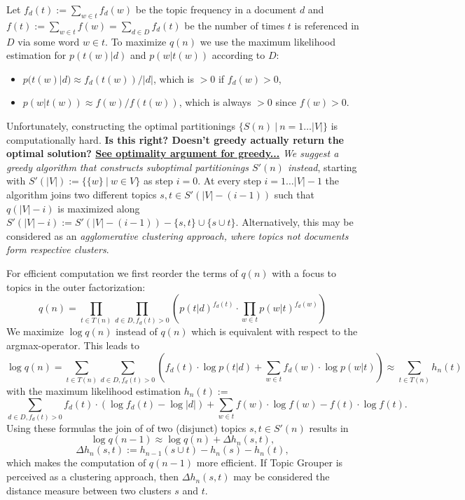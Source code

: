 \documentclass[10pt, a4paper, oneside]{article}
\begin{document}
Let $f_d(t) := \sum_{w \in t} f_d(w)$ be the topic frequency in a document $d$ and $f(t) := \sum_{w \in t} f(w) = \sum_{d \in D} f_d(t)$ be
the number of times $t$ is referenced in $D$ via some word $w \in t$.
To maximize $q(n)$ we use the maximum likelihood estimation for $p(t(w) | d)$ and $p(w | t(w))$ according to $D$:
\begin{itemize}
\item $p(t(w) | d) \approx f_d(t(w)) / |d|$, which is $> 0$ if $f_d(w) > 0$,
\item $p(w | t(w)) \approx f(w) / f(t(w))$, which is always $> 0$ since $f(w) > 0$. 
\end{itemize}

Unfortunately, constructing the optimal partitionings $\{ S(n)\ |\ n = 1\dots|V| \}$ is computationally hard.
\textbf{Is this right? Doesn't greedy actually return the optimal solution? \href{http://qpleple.com/greedy-algorithms/}{See optimality argument for greedy...}}
\emph{We suggest a greedy algorithm that constructs suboptimal partitionings $S'(n)$ instead}, starting with $S'(|V|) := \{ \{ w \}\ |\ w \in V \}$ as step $i = 0$.
At every step $i = 1\dots|V| - 1$ the algorithm joins two different topics $s,t \in S'(|V| - (i - 1))$ such that
$q(|V| - i)$ is maximized along $S'(|V| - i) := S'(|V| - (i - 1)) - \{s, t\} \cup \{ s \cup t \}$.
Alternatively, this may be considered as an \emph{agglomerative clustering approach, where topics not documents form respective clusters}. 

For efficient computation we first reorder the terms of $q(n)$ with a focus to topics in the outer factorization:
\[ q(n) = \prod_{t \in T(n)} \prod_{d \in D, f_d(t) > 0} (p(t | d)^{f_d(t)} \cdot \prod_{w\in t}p(w | t)^{f_d(w)})\]
We maximize $\log q(n)$ instead of $q(n)$ which is equivalent with respect to the argmax-operator. This leads to
\[ \log q(n) = \sum_{t \in T(n)} \sum_{d \in D, f_d(t) > 0} (f_d(t) \cdot \log p(t | d) + \sum_{w\in t} f_d(w) \cdot \log p(w | t)) \approx \sum_{t \in T(n)} h_n(t) \]
with the maximum likelihood estimation $h_n(t) :=$
\begin{equation} 
\label{eq:hnt} 
\sum_{d \in D, f_d(t) > 0} f_d(t) \cdot (\log f_d(t) - \log |d|) + \sum_{w\in t} f(w) \cdot \log f(w) - f(t) \cdot \log f(t).
\end{equation}
Using these formulas the join of of two (disjunct) topics $s, t \in S'(n)$ results in
\[ \log q(n - 1) \approx \log q(n) + \Delta h_n(s,t),\]  
\[\Delta h_n(s,t) := h_{n - 1}(s \cup t) - h_n(s) - h_n(t), \]
which makes the computation of $q(n - 1)$ more efficient.
If Topic Grouper is perceived as a clustering approach, then $\Delta h_n(s,t)$ may be considered the distance measure between two clusters $s$ and $t$.
\end{document}
